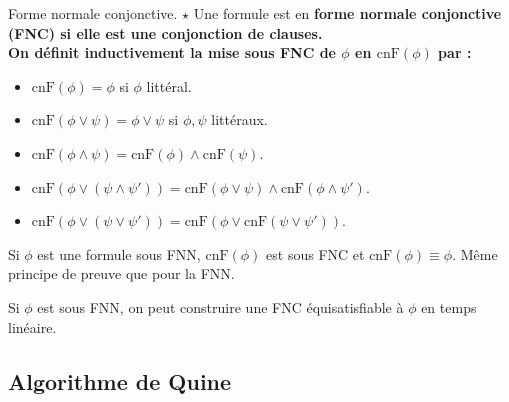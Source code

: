 \documentclass[french, 11pt]{article}
\newcommand*{\cnF}{\text{cnF}}
\begin{document}
\vspace*{-0.7cm}

\begin{defi}{Forme normale conjonctive. $\star$}{}
    Une formule est en \bf{forme normale conjonctive (FNC)} si elle est une conjonction de clauses.\\
    On définit inductivement la mise sous FNC de $\phi$ en $\cnF(\phi)$ par :
    \begin{itemize}[label=$\hra$]
        \item $\cnF(\phi)=\phi$ si $\phi$ littéral.
        \item $\cnF(\phi\lor\psi)=\phi\lor\psi$ si $\phi,\psi$ littéraux.
        \item $\cnF(\phi\land\psi)=\cnF(\phi)\land\cnF(\psi)$.
        \item $\cnF(\phi\lor(\psi\land\psi'))=\cnF(\phi\lor\psi)\land\cnF(\phi\land\psi')$.
        \item $\cnF(\phi\lor(\psi\lor\psi'))=\cnF(\phi\lor\cnF(\psi\lor\psi'))$.
    \end{itemize}
\end{defi}

\vspace*{-0.7cm}

\begin{prop}{}{}
    Si $\phi$ est une formule sous FNN, $\cnF(\phi)$ est sous FNC et $\cnF(\phi)\equiv\phi$.
    \tcblower
    Même principe de preuve que pour la FNN.
\end{prop}

\begin{prop}{}{}
    Si $\phi$ est sous FNN, on peut construire une FNC équisatisfiable à $\phi$ en temps linéaire.
\end{prop}

\vspace*{-0.7cm}

\subsection{Algorithme de Quine}
\end{document}
